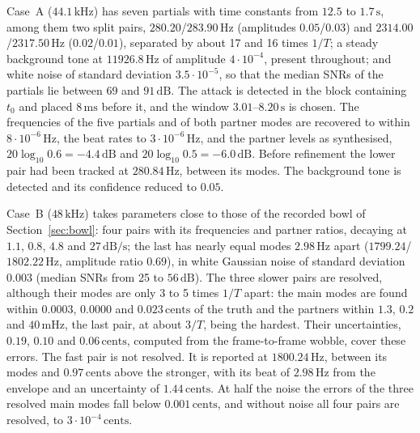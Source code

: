 \documentclass[10pt,a4paper,twocolumn]{article}
\newcommand{\Hz}{\,\mathrm{Hz}}
\newcommand{\dB}{\,\mathrm{dB}}
\newcommand{\s}{\,\mathrm{s}}
\newcommand{\ms}{\,\mathrm{ms}}
\newcommand{\ct}{\,\mathrm{cents}}
\begin{document}
Case~A ($44.1\,\mathrm{kHz}$) has seven partials with time constants from $12.5$ to $1.7\s$, among them two split pairs, $280.20$/$283.90\Hz$ (amplitudes $0.05$/$0.03$) and $2314.00$/$2317.50\Hz$ ($0.02$/$0.01$), separated by about 17 and 16 times $1/T$; a steady background tone at $11926.8\Hz$ of amplitude $4\cdot10^{-4}$, present throughout; and white noise of standard deviation $3.5\cdot10^{-5}$, so that the median SNRs of the partials lie between 69 and $91\dB$. The attack is detected in the block containing $t_0$ and placed $8\ms$ before it, and the window $3.01$--$8.20\s$ is chosen. The frequencies of the five partials and of both partner modes are recovered to within $8\cdot10^{-6}\Hz$, the beat rates to $3\cdot10^{-6}\Hz$, and the partner levels as synthesised, $20\log_{10}0.6 = -4.4\dB$ and $20\log_{10}0.5 = -6.0\dB$. Before refinement the lower pair had been tracked at $280.84\Hz$, between its modes. The background tone is detected and its confidence reduced to $0.05$.

Case~B ($48\,\mathrm{kHz}$) takes parameters close to those of the recorded bowl of Section~\ref{sec:bowl}: four pairs with its frequencies and partner ratios, decaying at $1.1$, $0.8$, $4.8$ and $27\dB/\mathrm{s}$; the last has nearly equal modes $2.98\Hz$ apart ($1799.24$/$1802.22\Hz$, amplitude ratio $0.69$), in white Gaussian noise of standard deviation $0.003$ (median SNRs from 25 to $56\dB$). The three slower pairs are resolved, although their modes are only 3 to 5 times $1/T$ apart: the main modes are found within $0.0003$, $0.0000$ and $0.023\ct$ of the truth and the partners within $1.3$, $0.2$ and $40\,\mathrm{mHz}$, the last pair, at about $3/T$, being the hardest. Their uncertainties, $0.19$, $0.10$ and $0.06\ct$, computed from the frame-to-frame wobble, cover these errors. The fast pair is not resolved. It is reported at $1800.24\Hz$, between its modes and $0.97\ct$ above the stronger, with its beat of $2.98\Hz$ from the envelope and an uncertainty of $1.44\ct$. At half the noise the errors of the three resolved main modes fall below $0.001\ct$, and without noise all four pairs are resolved, to $3\cdot10^{-4}\ct$.
\end{document}
